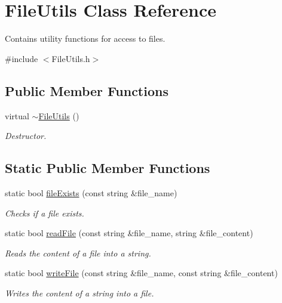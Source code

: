 \hypertarget{classFileUtils}{\section{File\-Utils Class Reference}
\label{classFileUtils}
}


Contains utility functions for access to files.  




{\ttfamily \#include $<$File\-Utils.\-h$>$}

\subsection*{Public Member Functions}
\begin{DoxyCompactItemize}
\item 
virtual \hyperlink{classFileUtils_a113a3a0ae84133a66408b20da027c0c7}{$\sim$\-File\-Utils} ()
\begin{DoxyCompactList}\small\item\em Destructor. \end{DoxyCompactList}\end{DoxyCompactItemize}
\subsection*{Static Public Member Functions}
\begin{DoxyCompactItemize}
\item 
static bool \hyperlink{classFileUtils_aa4a1c5a23271a5c284541504fffd2ba6}{file\-Exists} (const string \&file\-\_\-name)
\begin{DoxyCompactList}\small\item\em Checks if a file exists. \end{DoxyCompactList}\item 
static bool \hyperlink{classFileUtils_a1079af04bf2282d524df691ac8124879}{read\-File} (const string \&file\-\_\-name, string \&file\-\_\-content)
\begin{DoxyCompactList}\small\item\em Reads the content of a file into a string. \end{DoxyCompactList}\item 
static bool \hyperlink{classFileUtils_a812ab360ba9b90eb50c73f95e7e001ba}{write\-File} (const string \&file\-\_\-name, const string \&file\-\_\-content)
\begin{DoxyCompactList}\small\item\em Writes the content of a string into a file. \end{DoxyCompactList}\end{DoxyCompactItemize}
